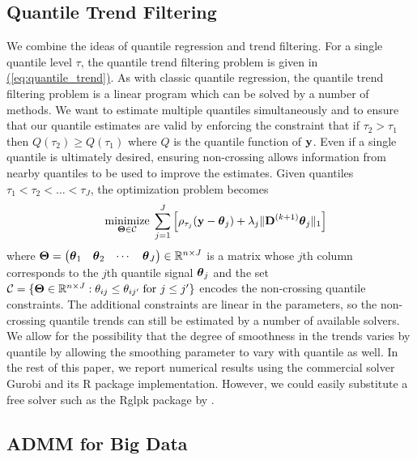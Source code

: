 \documentclass[aoas]{imsart}
\newcommand{\Eqn}[1]{\hyperref[eq:#1]{{\rm (\ref*{eq:#1})}}} %
\newcommand{\Eqn}[1]{{(\ref{eq:#1})}} %
\newcommand{\Real}{\mathbb{R}}
\newcommand{\V}[1]{{\bm{\mathbf{\MakeLowercase{#1}}}}} %
\newcommand{\M}[1]{{\bm{\mathbf{\MakeUppercase{#1}}}}} %
\newcommand{\ME}[2]{\MakeLowercase{#1}_{#2}} %
\newcommand{\Mn}[2]{\M{#1}^{(#2)}} %
\begin{document}
\subsection{Quantile Trend Filtering}

We combine the ideas of quantile regression and trend filtering. For a single quantile level $\tau$, the quantile trend filtering problem is given in \Eqn{quantile_trend}. As with classic quantile regression, the quantile trend filtering problem is a linear program which can be solved by a number of methods. We want to estimate multiple quantiles simultaneously and to ensure that our quantile estimates are valid by enforcing the constraint that if $\tau_2 > \tau_1$ then $Q(\tau_2) \ge Q(\tau_1)$ where $Q$ is the quantile function of $\V{y}$. Even if a single quantile is ultimately desired, ensuring non-crossing allows information from nearby quantiles to be used to improve the estimates. Given quantiles $\tau_1 < \tau_2 < \ldots < \tau_J$, the optimization problem becomes
\begin{eqnarray}
	\label{eq:noncross_trend}
	&&\underset{\M{\Theta} \in \mathcal{C}}{\text{minimize}}\; \sum_{j=1}^J \left [\rho_{\tau_j}(\V{y} - \V{\theta}_{j}) +
	\lambda_j \lVert \Mn{D}{k+1} \V{\theta}_j \rVert_1 \right ] 
\end{eqnarray}
where $\M{\Theta} = \begin{pmatrix} \V{\theta}_1 & \V{\theta}_2 & \cdots & \V{\theta}_J \end{pmatrix} \in \Real^{n \times J}$ is a matrix whose $j$th column corresponds to the $j$th quantile signal $\V{\theta}_j$ and the set $\mathcal{C} = \{\M{\Theta} \in \Real^{n \times J}: \ME{\theta}{ij} \leq \ME{\theta}{ij'} \;\text{for $j \leq j'$}\}$ encodes the non-crossing quantile constraints. The additional constraints are linear in the parameters, so the non-crossing quantile trends can still be estimated by a number of available solvers. We allow for the possibility that the degree of smoothness in the trends varies by quantile by allowing the smoothing parameter to vary with quantile as well. In the rest of this paper, we report numerical results using the commercial solver Gurobi \citep{gurobi} and its R package implementation. However, we could easily substitute a free solver such as the Rglpk package by \cite{rglpk}.

\subsection{ADMM for Big Data}
\end{document}
